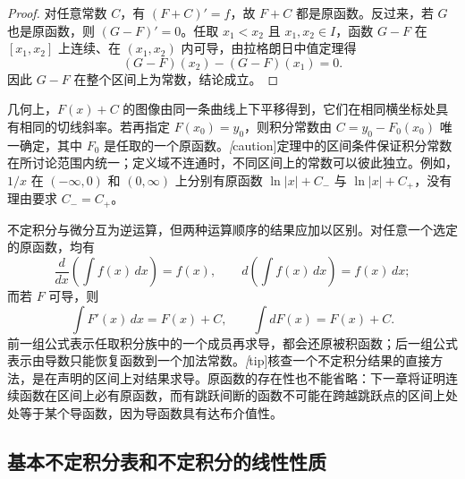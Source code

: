 \begin{proof}
对任意常数 $C$，有 $(F+C)'=f$，故 $F+C$ 都是原函数。反过来，若 $G$ 也是原函数，则 $(G-F)'=0$。任取 $x_1<x_2$ 且 $x_1,x_2\in I$，函数 $G-F$ 在 $[x_1,x_2]$ 上连续、在 $(x_1,x_2)$ 内可导，由拉格朗日中值定理得
\[
    (G-F)(x_2)-(G-F)(x_1)=0.
\]
因此 $G-F$ 在整个区间上为常数，结论成立。
\end{proof}

几何上，$F(x)+C$ 的图像由同一条曲线上下平移得到，它们在相同横坐标处具有相同的切线斜率。若再指定 $F(x_0)=y_0$，则积分常数由 $C=y_0-F_0(x_0)$ 唯一确定，其中 $F_0$ 是任取的一个原函数。\emph[caution]{定理中的区间条件保证积分常数在所讨论范围内统一；定义域不连通时，不同区间上的常数可以彼此独立。}例如，$1/x$ 在 $(-\infty,0)$ 和 $(0,\infty)$ 上分别有原函数 $\ln|x|+C_-$ 与 $\ln|x|+C_+$，没有理由要求 $C_-=C_+$。

不定积分与微分互为逆运算，但两种运算顺序的结果应加以区别。对任意一个选定的原函数，均有
\[
    \frac{d}{dx}\left(\int f(x)\,dx\right)=f(x),
    \qquad d\left(\int f(x)\,dx\right)=f(x)\,dx;
\]
而若 $F$ 可导，则
\[
    \int F'(x)\,dx=F(x)+C,
    \qquad \int dF(x)=F(x)+C.
\]
前一组公式表示任取积分族中的一个成员再求导，都会还原被积函数；后一组公式表示由导数只能恢复函数到一个加法常数。\emph[tip]{核查一个不定积分结果的直接方法，是在声明的区间上对结果求导。}原函数的存在性也不能省略：下一章将证明连续函数在区间上必有原函数，而有跳跃间断的函数不可能在跨越跳跃点的区间上处处等于某个导函数，因为导函数具有达布介值性。

\subsection{基本不定积分表和不定积分的线性性质}
\label{subsec:basic-integrals-and-linearity}


